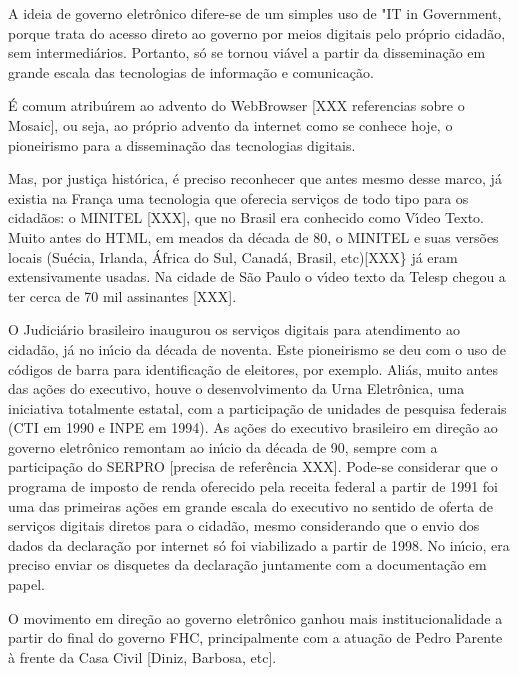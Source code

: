\documentclass[
12pt,		%
openright,	%
twoside,  %
a4paper,			%
chapter=TITLE,		%
english,			%
french,				%
spanish,			%
brazil				%
]{USPSC-classe/USPSC}
\begin{document}
A ideia de governo eletr\^onico difere-se de um simples uso de "IT in Government, porque trata do acesso direto ao governo por meios digitais pelo pr\'oprio cidad\~ao, sem intermedi\'arios. Portanto, s\'o se tornou vi\'avel a partir da dissemina\c{c}\~ao em grande escala das tecnologias de informa\c{c}\~ao e comunica\c{c}\~ao.


\'E comum atribu\'{\i}rem ao advento do WebBrowser [XXX referencias sobre o Mosaic], ou seja, ao pr\'oprio advento da internet como se conhece hoje, o pioneirismo para a dissemina\c{c}\~ao das tecnologias digitais.


Mas, por justi\c{c}a hist\'orica, \'e preciso reconhecer que antes mesmo desse marco, j\'a existia na Fran\c{c}a uma tecnologia que oferecia servi\c{c}os de todo tipo para os cidad\~aos: o MINITEL [XXX], que no Brasil era conhecido como V\'{\i}deo Texto. Muito antes do HTML, em meados da d\'ecada de 80, o MINITEL e suas vers\~oes locais (Su\'ecia, Irlanda, \'Africa do Sul, Canad\'a, Brasil, etc)[XXX\} j\'a eram extensivamente usadas. Na cidade de S\~ao Paulo o v\'{\i}deo texto da Telesp chegou a ter cerca de 70 mil assinantes [XXX].


O Judici\'ario brasileiro inaugurou os servi\c{c}os digitais para atendimento ao cidad\~ao, j\'a no in\'{\i}cio da d\'ecada de noventa. Este pioneirismo se deu com o uso de c\'odigos de barra para identifica\c{c}\~ao de eleitores, por exemplo. Ali\'as, muito antes das a\c{c}\~oes do executivo, houve o desenvolvimento da Urna Eletr\^onica, uma iniciativa totalmente estatal, com a participa\c{c}\~ao de unidades de pesquisa federais (CTI em 1990 e INPE em 1994). As a\c{c}\~oes do executivo brasileiro em dire\c{c}\~ao ao governo eletr\^onico remontam ao in\'{\i}cio da d\'ecada de 90, sempre com a participa\c{c}\~ao do SERPRO [precisa de refer\^encia XXX]. Pode-se considerar que o programa de imposto de renda oferecido pela receita federal a partir de 1991 foi uma das primeiras a\c{c}\~oes em grande escala do executivo no sentido de oferta de servi\c{c}os digitais diretos para o cidad\~ao, mesmo considerando que o envio dos dados da declara\c{c}\~ao por internet s\'o foi viabilizado a partir de 1998. No in\'{\i}cio, era preciso enviar os disquetes da declara\c{c}\~ao juntamente com a documenta\c{c}\~ao em papel.


O movimento em dire\c{c}\~ao ao governo eletr\^onico ganhou mais institucionalidade a partir do final do governo FHC, principalmente com a atua\c{c}\~ao de Pedro Parente \`a frente da Casa Civil [Diniz, Barbosa, etc].
\end{document}
